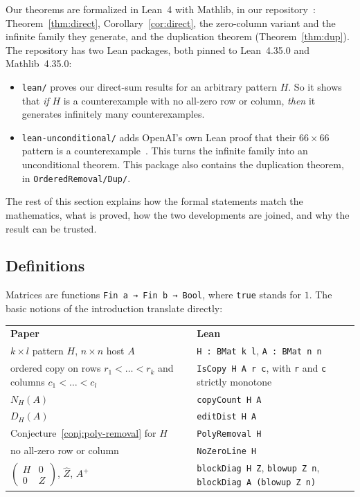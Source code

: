 \documentclass{article}
\theoremstyle{plain}
\theoremstyle{definition}
\begin{document}
Our theorems are formalized in Lean~4 with Mathlib, in our
repository~\cite{costcoLean}: Theorem~\ref{thm:direct}, Corollary~\ref{cor:direct},
the zero-column variant and the infinite family they generate, and the
duplication theorem (Theorem~\ref{thm:dup}). The repository has two Lean packages,
both pinned to Lean~4.35.0 and Mathlib~4.35.0:
\begin{itemize}\itemsep1pt
\item \texttt{lean/} proves our direct-sum results for an arbitrary pattern $H$. So it
  shows that \emph{if} $H$ is a counterexample with no all-zero row or column,
  \emph{then} it generates infinitely many counterexamples.
\item \texttt{lean-unconditional/} adds OpenAI's own Lean proof that their
  $66\times66$ pattern is a counterexample~\cite{openaiLean}. This turns the
  infinite family into an unconditional theorem. This package also contains the
  duplication theorem, in \texttt{OrderedRemoval/Dup/}.
\end{itemize}
The rest of this section explains how the formal statements match the
mathematics, what is proved, how the two developments are joined, and why the
result can be trusted.

\subsection*{Definitions}

Matrices are functions \lstinline[basicstyle=\ttfamily]|Fin a → Fin b → Bool|, where \texttt{true}
stands for $1$. The basic notions of the introduction translate directly:

\medskip
{\small
\begin{tabular}{@{}>{\raggedright\arraybackslash}p{}@{\quad}>{\raggedright\arraybackslash}p{}@{}}
  \textbf{Paper} & \textbf{Lean}\\[2pt]
  $k\times l$ pattern $H$, $n\times n$ host $A$ & \texttt{H : BMat k l}, \texttt{A : BMat n n}\\
  ordered copy on rows $r_1<\dots<r_k$ and columns $c_1<\dots<c_l$
    & \texttt{IsCopy H A r c}, with \texttt{r} and \texttt{c} strictly monotone\\
  $N_H(A)$ & \texttt{copyCount H A}\\
  $D_H(A)$ & \texttt{editDist H A}\\
  Conjecture~\ref{conj:poly-removal} for $H$ & \texttt{PolyRemoval H}\\
  no all-zero row or column & \texttt{NoZeroLine H}\\
  $\left(\begin{smallmatrix} H & 0\\ 0 & Z\end{smallmatrix}\right)$, $\widehat Z$, $A^+$
    & \texttt{blockDiag H Z}, \texttt{blowup Z n}, \texttt{blockDiag A (blowup Z n)}
\end{tabular}}
\end{document}
